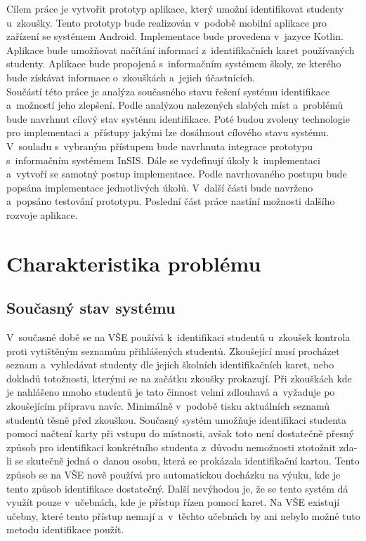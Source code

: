 \documentclass[12pt, a4paper]{report}
\begin{document}
	Cílem práce je vytvořit prototyp aplikace, který umožní identifikovat studenty u~zkoušky.
	Tento prototyp bude realizován v~podobě mobilní aplikace pro zařízení se systémem Android.
	Implementace bude provedena v~jazyce Kotlin.
	Aplikace bude umožňovat načítání informací z~identifikačních karet používaných studenty.
	Aplikace bude propojená s~informačním systémem školy, ze kterého bude získávat informace o~zkouškách a~jejich účastnících.
	\\
	
	Součástí této práce je analýza současného stavu řešení systému identifikace a~možností jeho zlepšení.
	Podle analýzou nalezených slabých míst a~problémů bude navrhnut cílový stav systému identifikace.
	Poté budou zvoleny technologie pro implementaci a~přístupy jakými lze dosáhnout cílového stavu systému.
	V~souladu s~vybraným přístupem bude navrhnuta integrace prototypu s~informačním systémem InSIS.
	Dále se vydefinují úkoly k~implementaci a~vytvoří se samotný postup implementace.
	Podle navrhovaného postupu bude popsána implementace jednotlivých úkolů.
	V~další části bude navrženo a~popsáno testování prototypu. Poslední část práce nastíní možnosti dalšího rozvoje aplikace.
	
	
	\chapter{Charakteristika problému}
		\section{Současný stav systému}
		V~současné době se na VŠE používá k~identifikaci studentů u~zkoušek kontrola proti vytištěným seznamům přihlášených studentů.
		Zkoušející musí procházet seznam a~vyhledávat studenty dle jejich školních identifikačních karet, nebo dokladů totožnosti, kterými se na začátku zkoušky prokazují.
		Při zkouškách kde je nahlášeno mnoho studentů je tato činnost velmi zdlouhavá a~vyžaduje po zkoušejícím přípravu navíc. 
		Minimálně v~podobě tisku aktuálních seznamů studentů těsně před zkouškou. Současný systém umožňuje identifikaci studenta pomocí načtení karty při vstupu do místnosti,
		avšak toto není dostatečně přesný způsob pro identifikaci konkrétního studenta z~důvodu nemožnosti ztotožnit zda-li se skutečně jedná o~danou osobu, 
		která se prokázala identifikační kartou.
		Tento způsob se na VŠE nově používá pro automatickou docházku na výuku, kde je tento způsob identifikace dostatečný. 
		Další nevýhodou je, že se tento systém dá využít pouze v~učebnách, kde je přístup řízen pomocí karet. Na VŠE existují učebny, které tento přístup nemají 
		a~v~těchto učebnách by ani nebylo možné tuto metodu identifikace použít.
		\\
		
\end{document}
